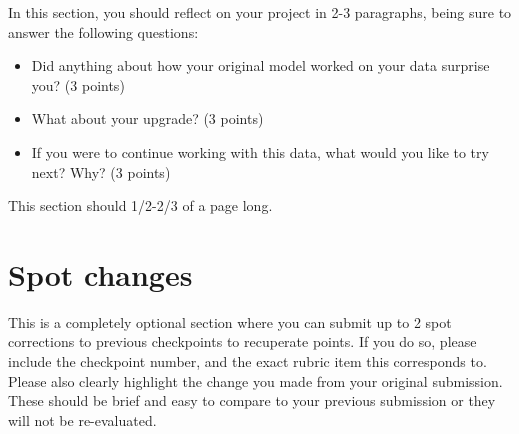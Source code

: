 \documentclass[12pt]{article}
\begin{document}
In this section, you should reflect on your project in 2-3 paragraphs, being sure to answer the following questions:
\begin{itemize}
	\item Did anything about how your original model worked on your data surprise you? (3 points)
	\item What about your upgrade? (3 points)
	\item If you were to continue working with this data, what would you like to try next?  Why? (3 points)
\end{itemize}

This section should 1/2-2/3 of a page long.

\section{Spot changes}

This is a completely optional section where you can submit up to 2 spot corrections to previous checkpoints to recuperate points.  If you do so, please include the checkpoint number, and the exact rubric item this corresponds to.  Please also clearly highlight the change you made from your original submission.  These should be brief and easy to compare to your previous submission or they will not be re-evaluated.
\end{document}
